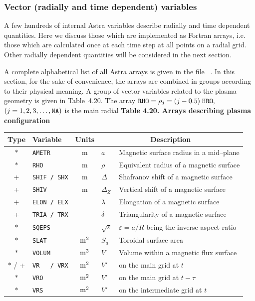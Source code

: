 \subsubsection{Vector (radially and time dependent) variables} 

A few hundreds of internal Astra variables describe radially and time
dependent quantities. 
Here we discuss those which are implemented as Fortran arrays,
i.e. those which are calculated once at each time step at all points on
a radial grid.
Other radially dependent quantities will be considered in the
next section.

A complete alphabetical list of all Astra arrays is given in the file~
. 
In this section, for the sake of convenience, the arrays are combined in
groups according to their physical meaning. 
A group of vector variables related to the plasma geometry is given in
Table~4.20.
The array ${\tt RHO}=\rho_j=(j-0.5)\;{\tt HRO},$ $(j=1,2,3,\dots,\tt NA)$ 
is the main radial 
\linebreak
\indent
{\bf Table 4.20. Arrays describing plasma configuration}\bigskip\\
\begin{tabular}{| c | l | c | l  l |}\hline
\hspace*{-1pt}\bf Type\hspace*{-1pt} & \bf Variable    
		&\bf Units &\multicolumn{2}{|c|}{\bf Description}\\	\hline
$*$&\tt AMETR     & m & $a$ & Magnetic surface radius in a mid--plane\\
$*$&\tt RHO       & m & $\rho$ & Equivalent radius of a magnetic surface \\
+ &\tt SHIF / SHX& m & $\Delta$ & Shafranov shift of a magnetic surface \\
+ &\tt SHIV      & m & $\Delta_Z$ & Vertical shift of a magnetic surface\\
+ &\tt ELON / ELX&   & $\lambda$ & Elongation of a magnetic surface \\
+ &\tt TRIA / TRX&   & $\delta$ & Triangularity of a magnetic surface \\
$*$&\tt SQEPS     &   & $\sqrt{\varepsilon}$ & $\varepsilon=a/R$ 
			being the  inverse aspect ratio\\
$*$ &\tt SLAT  & ${\rm m}^2$ & $S_a$ & Toroidal surface area \\
$*$ &\tt VOLUM & ${\rm m}^3$ & $V$ & Volume within a magnetic flux surface\\
$*$ / +&\tt VR~~~/ VRX& ${\rm m}^2$ & $V'$ & on the main grid at $t$\\
$*$&\tt VRO   & ${\rm m}^2$ & $V'$ & on the main grid at $t-\tau$\\
$*$&\tt VRS   & ${\rm m}^2$ & $V'$ & on the intermediate grid at $t$\\
\hline
\end{tabular}\bigskip\\ %
